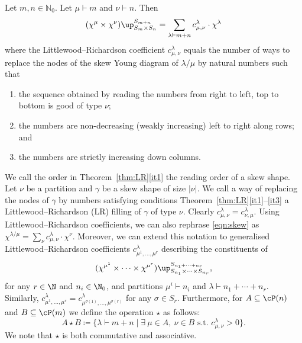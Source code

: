 \begin{theorem}\label{thm:LR}
	Let $m,n\in\mathbb{N}_0$. Let $\mu\vdash m$ and $\nu\vdash n$. Then
	\[ (\chi^\mu\times\chi^\nu)\up^{S_{m+n}}_{S_m\times S_n} = \sum_{\lambda\vdash m+n} c^\lambda_{\mu,\nu}\cdot \chi^\lambda\]
	where the Littlewood--Richardson coefficient $c^\lambda_{\mu,\nu}$ equals the number of ways to replace the nodes of the skew Young diagram of $\lambda/\mu$ by natural numbers such that
	\begin{enumerate}[label=(\roman*)]
		\item\label{it1} the sequence obtained by reading the numbers from right to left, top to bottom is good of type $\nu$;
		\item \label{it2} the numbers are non-decreasing \textup{(}weakly increasing\textup{)} left to right along rows; and
		\item \label{it3} the numbers are strictly increasing down columns.
	\end{enumerate}
\end{theorem}

We call the order in Theorem~\ref{thm:LR}\ref{it1} the reading order of a skew shape. Let $\nu$ be a partition and $\gamma$ be a skew shape of size $|\nu|$. We call a way of replacing the nodes of $\gamma$ by numbers satisfying conditions Theorem~\ref{thm:LR}\ref{it1}--\ref{it3} a Littlewood--Richardson (LR) filling of $\gamma$ of type $\nu$. 
Clearly $c^\lambda_{\mu,\nu}=c^\lambda_{\nu,\mu}$. Using Littlewood--Richardson coefficients, we can also rephrase \eqref{eqn:skew} as $\chi^{\lambda/\mu}=\sum_\nu c^\lambda_{\mu,\nu}\cdot \chi^\nu$. Moreover, we can extend this notation to generalised Littlewood--Richardson coefficients $c^\lambda_{\mu^1,\dotsc,\mu^r}$ describing the constituents of
\[ (\chi^{\mu^1}\times\cdots\times\chi^{\mu^r})\up_{S_{n_1}\times\cdots\times S_{n_r}}^{S_{n_1+\cdots+n_r}}, \]
for any $r\in\N$ and $n_i\in\N_0$, and partitions $\mu^i\vdash n_i$ and $\lambda\vdash n_1+\cdots+n_r$. Similarly, $c^\lambda_{\mu^1,\dotsc,\mu^r}=c^\lambda_{\mu^{\sigma(1)},\dotsc,\mu^{\sigma(r)}}$ for any $\sigma\in S_r$. Furthermore, for $A\subseteq\cP(n)$ and $B\subseteq\cP(m)$ we define the operation $\star$ as follows:
\[ A\star B\coloneqq  \{\lambda\vdash m+n \mid \exists\ \mu\in A,\ \nu\in B\text{ s.t. }c^\lambda_{\mu,\nu}>0 \}. \]
We note that $\star$ is both commutative and associative.

